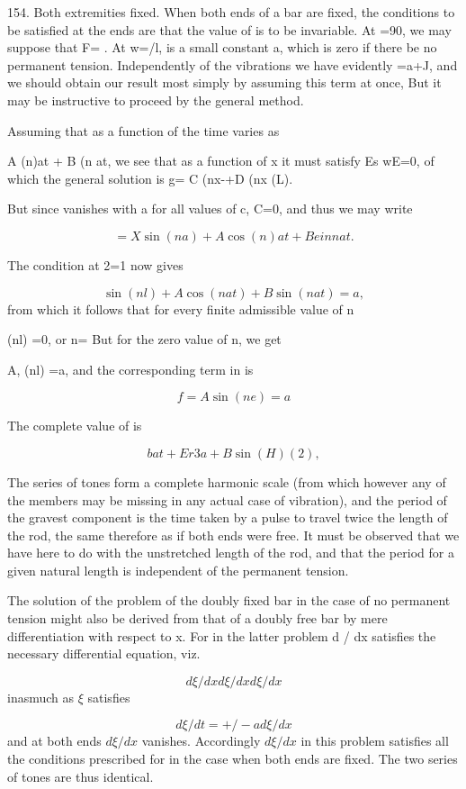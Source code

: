 154. Both extremities fixed.  When both ends of a bar are fixed, the conditions
to be satisfied at the ends are that the value of is to be invariable. At =90,
we may suppose that F= . At w=/l, is a small constant a, which is zero if there
be no permanent tension. Independently of the vibrations we have evidently
=a+J,
and we should obtain our result most simply by assuming this term at once, But
it may be instructive to proceed by the general method.

Assuming that as a function of the time varies as

A (n)at + B (n at, we see that as a function of x it must satisfy Es
wE=0, of which the general solution is g= C (nx-+D (nx (L).

But since vanishes with a for all values of c, C=0, and thus we may
write

\[=X \sin(na) +  A \cos(n)at + B e in nat.\]

The condition at 2=1 now gives

\[\sin(nl) +  A \cos(nat) +B \sin(nat) =a,\]
from which it follows that for every finite admissible value of n

(nl) =0, or n= But for the zero value of n, we get

A, (nl) =a,
and the corresponding term in is

\[f= A \sin(ne) =a\]

The complete value of is

\[bat +E r 3 a +B \sin(H) (2),\]

The series of tones form a complete harmonic scale (from which however
any of the members may be missing in any actual case of vibration), and
the period of the gravest component is the time taken by a pulse to
travel twice the length of the rod, the same therefore as if both ends
were free. It must be observed that we have here to do with the
unstretched length of the rod, and that the period for a given natural
length is independent of the permanent tension.

The solution of the problem of the doubly fixed bar in the case of no
permanent tension might also be derived from that of a doubly free bar
by mere differentiation with respect to x. For in the latter problem d /
dx satisfies the necessary differential equation, viz.

\[d \xi/ dx d \xi/ dx d \xi/ dx\]
inasmuch as \(\xi\) satisfies

\[d \xi/ dt =  +/-  a  d \xi/ dx\]
and at both ends \(d \xi /dx\) vanishes. Accordingly \(d \xi /dx\) in
this problem satisfies all the conditions prescribed for in the case
when both ends are fixed. The two series of tones are thus identical.

